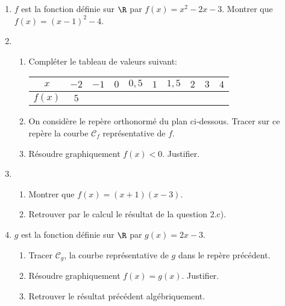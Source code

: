 \documentclass[a4paper]{article}
\begin{document}
  \begin{exercice}{}{}
  \begin{enumerate}
    \item $f$ est la fonction définie sur $\R$ par $f(x)=x^2-2x-3$. Montrer que $f(x)=(x-1)^2-4$.
    \item  \begin{enumerate}
      \item Compléter le tableau de valeurs suivant:
      \begin{tabular}{|*{10}{c|}}
        \hline
       $x$ & $-2$ & $-1$ & $0$ & $0,5$ & $1$ & $1,5$ & $2$ & $3$ & $4$ \\
       \hline
       $f(x)$ & $5$ & & & & & & & & \\
       \hline
      \end{tabular}
      \item On considère le repère orthonormé du plan ci-dessous. Tracer sur ce repère la courbe $\mathcal{C}_f$ 
      représentative de $f$.
  \begin{center}
  
  \end{center}
  
  \item Résoudre graphiquement $f(x)<0$. Justifier.
    \end{enumerate}
    \item \begin{enumerate}
      \item Montrer que $f(x)=(x+1)(x-3)$.
      \item Retrouver par le calcul le résultat de la question 2.c).
    \end{enumerate}
    \item $g$ est la fonction définie sur $\R$ par $g(x)=2x-3$.
    \begin{enumerate}
      \item Tracer $\mathcal{C}_g$, la courbe représentative de $g$ dans le repère précédent.
      \item Résoudre graphiquement $f(x)=g(x)$. Justifier.
      \item Retrouver le résultat précédent algébriquement.
    \end{enumerate}
  \end{enumerate}
  \end{exercice}
  
\end{document}
